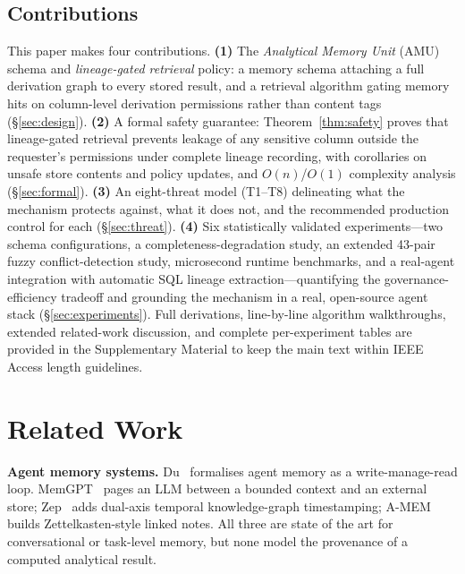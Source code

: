 \documentclass[nolineno]{ieeeaccess}
\begin{document}
\subsection{Contributions}

This paper makes four contributions.
\textbf{(1)} The \emph{Analytical Memory Unit} (AMU) schema and
\emph{lineage-gated retrieval} policy: a memory schema attaching a full
derivation graph to every stored result, and a retrieval algorithm gating
memory hits on column-level derivation permissions rather than content tags
(\S\ref{sec:design}).
\textbf{(2)} A formal safety guarantee: Theorem~\ref{thm:safety} proves that
lineage-gated retrieval prevents leakage of any sensitive column outside the
requester's permissions under complete lineage recording, with corollaries
on unsafe store contents and policy updates, and $O(n)$/$O(1)$ complexity
analysis (\S\ref{sec:formal}).
\textbf{(3)} An eight-threat model (T1--T8) delineating what the mechanism
protects against, what it does not, and the recommended production control
for each (\S\ref{sec:threat}).
\textbf{(4)} Six statistically validated experiments---two schema
configurations, a completeness-degradation study, an extended 43-pair fuzzy
conflict-detection study, microsecond runtime benchmarks, and a real-agent
integration with automatic SQL lineage extraction---quantifying the
governance-efficiency tradeoff and grounding the mechanism in a real,
open-source agent stack (\S\ref{sec:experiments}).
Full derivations, line-by-line algorithm walkthroughs, extended related-work
discussion, and complete per-experiment tables are provided in the
Supplementary Material to keep the main text within IEEE Access length
guidelines.

\section{Related Work}
\label{sec:related}

\textbf{Agent memory systems.}
Du~\cite{du2026survey} formalises agent memory as a write-manage-read loop.
MemGPT~\cite{packer2023memgpt} pages an LLM between a bounded context and an
external store; Zep~\cite{rasmussen2025zep} adds dual-axis temporal
knowledge-graph timestamping; A-MEM~\cite{xu2025amem} builds
Zettelkasten-style linked notes.
All three are state of the art for conversational or task-level memory, but
none model the provenance of a computed analytical result.
\end{document}

